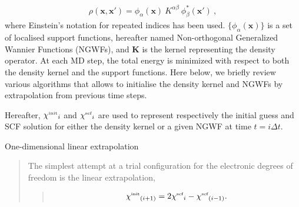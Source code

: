 \documentclass[letterpaper,10pt,english]{sphinxmanual}
\begin{document}
\label{\detokenize{BOMD:equation-dkn}}\begin{equation}\label{equation:BOMD:dkn}
\begin{split}\rho(\mathbf{x},\mathbf{x'}) = \phi_{\alpha}(\mathbf{x}) \ K^{\alpha \beta} \ \phi^*_{\beta}(\mathbf{x'}) \ ,\end{split}
\end{equation}
where Einstein’s notation for repeated indices has been used.
\(\{\phi_{\alpha}(\mathbf{x})\}\) is a set of localised support
functions, hereafter named Non-orthogonal Generalized Wannier Functions
(NGWFs), and \(\mathbf{K}\) is the kernel representing the density
operator. At each MD step, the total energy is minimized with respect to
both the density kernel and the support functions. Here below, we
briefly review various algorithms that allows to initialise the density
kernel and NGWFs by extrapolation from previous time steps.

Hereafter, \(\chi{^{\mbox{\tiny{init}}}}_i\) and
\(\chi{^{\mbox{\tiny{scf}}}}_i\) are used to represent respectively
the initial guess and SCF solution for either the density kernel or a
given NGWF at time \(t=i\Delta t\).

One-dimensional linear extrapolation
\begin{quote}

\begin{DUlineblock}{0em}
\item[] The simplest attempt at a trial configuration for the electronic
degrees of freedom is the linear extrapolation,
\end{DUlineblock}
\begin{quote}
\label{\detokenize{BOMD:equation-linxtpol1}}\begin{equation}\label{equation:BOMD:linxtpol1}
\begin{split}\chi{^{\mbox{\tiny{init}}}}_{(i+1)} = 2\chi{^{\mbox{\tiny{scf}}}}_{i}-\chi{^{\mbox{\tiny{scf}}}}_{(i-1)}.\end{split}
\end{equation}\end{quote}
\end{quote}
\end{document}
